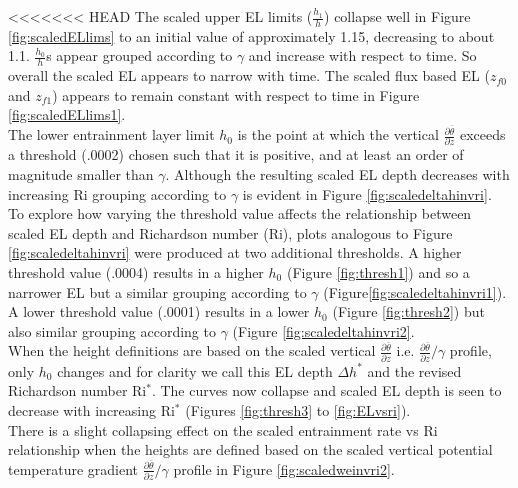 <<<<<<< HEAD
The scaled upper EL limits ($\frac{h_{1}}{h}$) collapse well in Figure \ref{fig:scaledELlims} 
to an initial value of approximately 1.15, decreasing to about 1.1.  $\frac{h_{0}}{h}$s appear 
grouped according to $\gamma$ and increase with respect to time.  So overall the scaled \acs{EL} appears
to narrow with time.   The scaled flux based \acs{EL} ($z_{f0}$ and $z_{f1}$) appears to remain constant 
with respect to time in Figure \ref{fig:scaledELlims1}.\\

The lower entrainment layer limit $h_{0}$ is the point at which the vertical 
$\frac{\partial \overline{\theta}}{\partial z}$ exceeds a threshold (.0002) chosen such that
it is positive, and at least an order of magnitude smaller than $\gamma$.   Although the resulting 
scaled \acs{EL} depth decreases with increasing \acs{Ri} grouping according to $\gamma$ is evident 
in Figure \ref{fig:scaledeltahinvri}.\\

To explore how varying the threshold value affects the relationship between scaled \acs{EL} depth
and Richardson number (\acs{Ri}), plots analogous to Figure \ref{fig:scaledeltahinvri} were produced at two 
additional thresholds.  A higher threshold value (.0004) results in a higher $h_{0}$ (Figure \ref{fig:thresh1})   
and so a narrower \acs{EL} but a similar grouping according to $\gamma$ (Figure\ref{fig:scaledeltahinvri1}).
A lower threshold value (.0001) results in a lower $h_{0}$ (Figure \ref{fig:thresh2})
but also similar grouping according to $\gamma$ (Figure \ref{fig:scaledeltahinvri2}.\\

When the height definitions are based on the scaled vertical $\frac{\partial \overline{\theta}}{\partial z}$
i.e. $\frac{\partial \overline{\theta}}{\partial z} / \gamma$ profile, only $h_{0}$ changes and for clarity we 
call this \acs{EL} depth $\Delta h^{*}$ and the revised Richardson number Ri$^{*}$.   The curves now collapse and 
scaled \acs{EL} depth is seen to decrease with increasing \acs{Ri}$^{*}$ (Figures \ref{fig:thresh3} to \ref{fig:ELvsri}).\\

There is a slight collapsing effect on the scaled entrainment rate vs \acs{Ri} relationship when
the heights are defined based on the scaled vertical potential temperature gradient 
$\frac{\partial \overline{\theta}}{\partial z} / \gamma$ profile in Figure \ref{fig:scaledweinvri2}.\\

